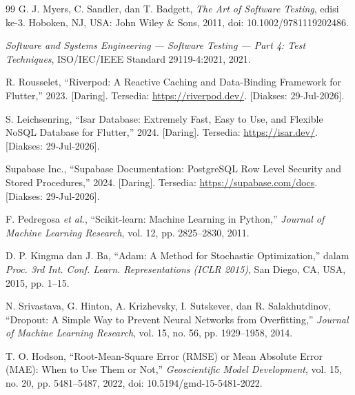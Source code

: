\documentclass[10pt,a4paper]{article}
\begin{document}
\begin{thebibliography}{99}
G. J. Myers, C. Sandler, dan T. Badgett, \textit{The Art of Software Testing}, edisi ke-3. Hoboken, NJ, USA: John Wiley \& Sons, 2011, doi: 10.1002/9781119202486.

\textit{Software and Systems Engineering --- Software Testing --- Part 4: Test Techniques}, ISO/IEC/IEEE Standard 29119-4:2021, 2021.

R. Rousselet, ``Riverpod: A Reactive Caching and Data-Binding Framework for Flutter,'' 2023. [Daring]. Tersedia: \url{https://riverpod.dev/}. [Diakses: 29-Jul-2026].

S. Leichsenring, ``Isar Database: Extremely Fast, Easy to Use, and Flexible NoSQL Database for Flutter,'' 2024. [Daring]. Tersedia: \url{https://isar.dev/}. [Diakses: 29-Jul-2026].

Supabase Inc., ``Supabase Documentation: PostgreSQL Row Level Security and Stored Procedures,'' 2024. [Daring]. Tersedia: \url{https://supabase.com/docs}. [Diakses: 29-Jul-2026].

F. Pedregosa \textit{et al.}, ``Scikit-learn: Machine Learning in Python,'' \textit{Journal of Machine Learning Research}, vol. 12, pp. 2825--2830, 2011.

D. P. Kingma dan J. Ba, ``Adam: A Method for Stochastic Optimization,'' dalam \textit{Proc. 3rd Int. Conf. Learn. Representations (ICLR 2015)}, San Diego, CA, USA, 2015, pp. 1--15.

N. Srivastava, G. Hinton, A. Krizhevsky, I. Sutskever, dan R. Salakhutdinov, ``Dropout: A Simple Way to Prevent Neural Networks from Overfitting,'' \textit{Journal of Machine Learning Research}, vol. 15, no. 56, pp. 1929--1958, 2014.

T. O. Hodson, ``Root-Mean-Square Error (RMSE) or Mean Absolute Error (MAE): When to Use Them or Not,'' \textit{Geoscientific Model Development}, vol. 15, no. 20, pp. 5481--5487, 2022, doi: 10.5194/gmd-15-5481-2022.
\end{thebibliography}
\endgroup
\end{document}
